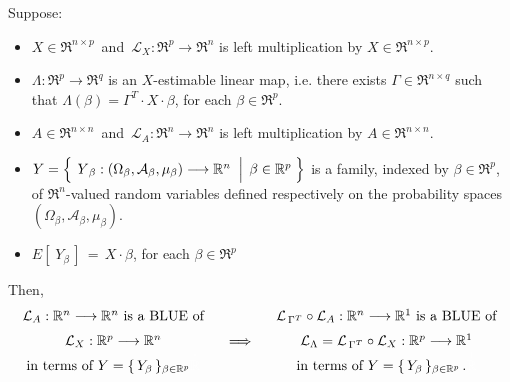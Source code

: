 \begin{proposition}
\mbox{}\vskip 0.1cm\noindent
Suppose:
\begin{itemize}
\item
	$X \in \Re^{n \times p}$\, and 
	\,$\mathcal{L}_{X} : \Re^{p} \longrightarrow \Re^{n}$ is left multiplication by $X \in \Re^{n \times p}$.
\item
	$\Lambda : \Re^{p} \longrightarrow \Re^{q}$ is an $X$-estimable linear map, i.e.
	there exists $\Gamma \in \Re^{n \times q}$ such that
	$\Lambda(\beta) = \Gamma^{T} \cdot X \cdot \beta$, for each $\beta \in \Re^{p}$.
\item
	$A \in \Re^{n \times n}$\, and 
	\,$\mathcal{L}_{A} : \Re^{n} \longrightarrow \Re^{n}$ is left multiplication by $A \in \Re^{n \times n}$.
\item
	$Y = \left\{\;
		\left.
		\overset{{\color{white}.}}{Y}_{\beta} : (\Omega_{\beta},\mathcal{A}_{\beta},\mu_{\beta}) \longrightarrow \Re^{n}
		\;\;\right\vert\;
		\beta \in \Re^{p}
		\;\right\}$
	is a family, indexed by $\beta \in \Re^{p}$,
	of $\Re^{n}$-valued random variables defined respectively on the
	probability spaces $(\Omega_{\beta},\mathcal{A}_{\beta},\mu_{\beta})$.
\item
	$E\!\left[\;Y_{\beta}\,\right] \,=\, X \cdot \beta$, for each $\beta \in \Re^{p}$
\end{itemize}
Then, \vskip -0.5cm
\begin{equation*}
\begin{array}{c}
	\textnormal{$\mathcal{L}_{A} : \Re^{n} \longrightarrow \Re^{n}$ is a BLUE of}
	\\
	\textnormal{$\overset{{\color{white}+}}{\mathcal{L}}_{X} : \Re^{p} \longrightarrow \Re^{n}$}
	\\
	\textnormal{in terms of $Y = \{\,Y_{\beta}\,\}_{\beta\in\Re^{p}}$}
		{\color{white}\overset{+}{\Re}}
	\end{array}
\quad\Longrightarrow\quad
\begin{array}{c}
	\textnormal{$\mathcal{L}_{\,\Gamma^{T}} \circ \mathcal{L}_{A} : \Re^{n} \longrightarrow \Re^{1}$ is a BLUE of}
	\\
	\textnormal{$\mathcal{L}_{\Lambda} = \overset{{\color{white}+}}{\mathcal{L}}_{\,\Gamma^{T}} \circ \mathcal{L}_{X} :
		\Re^{p} \longrightarrow \Re^{1}$}
	\\
	\textnormal{in terms of $Y = \{\,Y_{\beta}\,\}_{\beta\in\Re^{p}}$\,.}
		{\color{white}\overset{+}{\Re}}
	\end{array}
\end{equation*}
\end{proposition}


